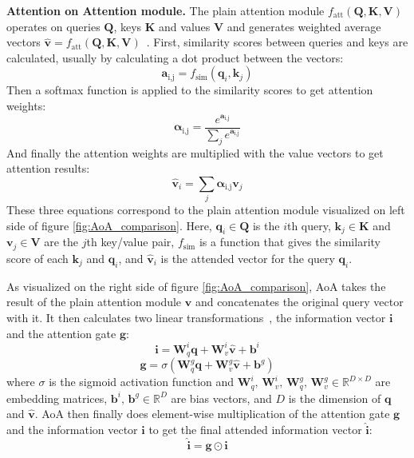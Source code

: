\documentclass[english,twoside,openright]{HYgraduMLDS}
\newcommand{\matr}[1]{\bm{#1}}
\newcommand{\vect}[1]{\bm{#1}}
\begin{document}
\textbf{Attention on Attention module.} The plain attention module $f_{\text{att}}(\matr{Q}, \matr{K}, \matr{V} )$ operates on queries $\matr{Q}$, keys $\matr{K}$ and values $\matr{V}$ and generates weighted average vectors $\hat{\vect{v}} = f_{\text{att}}(\matr{Q}, \matr{K}, \matr{V})$~\cite{AoA}. First, similarity scores between queries and keys are calculated, usually by calculating a dot product between the vectors:
\begin{equation}
\vect{a}_{\text{i,j}} = f_{\text{sim}}(\vect{q}_i, \vect{k}_j)
\end{equation}
%
Then a softmax function is applied to the similarity scores to get attention weights:
\begin{equation}
\vect{\alpha}_{\text{i,j}} = \frac{e^{\vect{a}_{\text{i,j}}}}{\sum_{j}e^{\vect{a}_{\text{i,j}}}}
\end{equation}
%
And finally the attention weights are multiplied with the value vectors to get attention results:
\begin{equation}
\hat{\vect{v}}_{i} = \sum_{j}\vect{\alpha}_{\text{i,j}} \vect{v}_{j}
\end{equation}
%
These three equations correspond to the plain attention module visualized on left side of figure \ref{fig:AoA_comparison}. Here, $\vect{q}_i \in \matr{Q}$ is the $i$th query, $\vect{k}_j \in \matr{K}$ and $\vect{v}_j \in \matr{V}$ are the $j$th key/value pair, $f_{\text{sim}}$ is a function that gives the similarity score of each $\vect{k}_j$ and $\vect{q}_i$, and $\hat{\vect{v}}_i$ is the attended vector for the query $\vect{q}_i$.

As visualized on the right side of figure \ref{fig:AoA_comparison}, AoA takes the result of the plain attention module $\hat{\vect{v}}$ and concatenates the original query vector with it. It then calculates two linear transformations~\cite{AoA}, the information vector $\vect{i}$ and the attention gate $\vect{g}$:
\begin{equation}
\vect{i} = \matr{W}_{q}^{i} \vect{q} + \matr{W}_{v}^{i}\hat{\vect{v}} + \vect{b}^i
\end{equation}
\begin{equation}
\vect{g} = \sigma(\matr{W}_{q}^{g} \vect{q} + \matr{W}_{v}^{g}\hat{\vect{v}} + \vect{b}^g)
\end{equation}
%
where $\sigma$ is the sigmoid activation function and $\matr{W}_{q}^{i} \text{, } \matr{W}_{v}^{i} \text{, } \matr{W}_{q}^{g} \text{, } \matr{W}_{v}^{g} \in \mathbb{R}^{D \times D}$ are embedding matrices, $\vect{b}^i \text{, } \vect{b}^g \in \mathbb{R}^D$ are bias vectors, and $D$ is the dimension of $\vect{q}$ and $\vect{\hat{v}}$. AoA then finally does element-wise multiplication of the attention gate $\vect{g}$ and the information vector $\vect{i}$ to get the final attended information vector $\hat{\vect{i}}$:
\begin{equation}
\hat{\vect{i}} = \vect{g} \odot \vect{i}
\end{equation}
\end{document}
